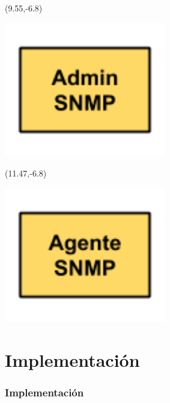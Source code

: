 \documentclass{beamer}
\begin{document}
\begin{frame}
\pause

\begin{textblock}{3}(9.55,-6.8)
\begin{minipage}{\textwidth}
\setlength{\parindent}{0pt}
\setlength{\parskip}{0.1cm}
\includegraphics[width=0.53\textwidth, right]{imagenes/buildingblockadminsnmp.png}
\end{minipage}
\end{textblock}

\begin{textblock}{3}(11.47,-6.8)
\begin{minipage}{\textwidth}
\setlength{\parindent}{0pt}
\setlength{\parskip}{0.1cm}
\includegraphics[width=0.53\textwidth, right]{imagenes/buildingblockagentesnmp.png}
\end{minipage}
\end{textblock}
\end{frame}


\section{Implementaci\'on} 

\begin{frame}
\frametitle{Implementaci\'on} 

\end{frame}
\end{document}

